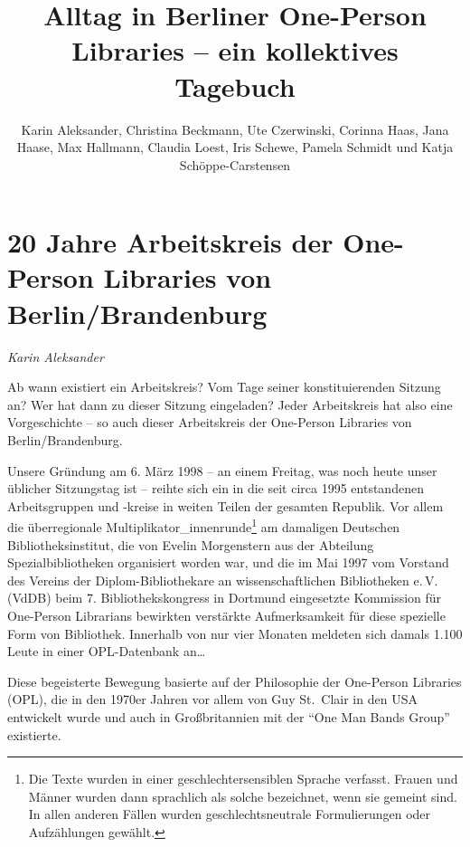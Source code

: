 \documentclass[a4paper,
fontsize=11pt,
oneside,
numbers=noperiodatend,
parskip=half-,
bibliography=totoc,
final
]{scrartcl}
\title{\LARGE{Alltag in Berliner One-Person Libraries -- ein kollektives Tagebuch}} %
\author{\parbox{10cm}{Karin Aleksander, Christina Beckmann, Ute Czerwinski, Corinna Haas, Jana Haase, Max Hallmann, Claudia Loest, Iris Schewe, Pamela Schmidt und Katja Schöppe-Carstensen}} %
\date{}
\begin{document}
\maketitle
\thispagestyle{fancyplain} 


\hypertarget{jahre-arbeitskreis-der-one-person-libraries-von-berlinbrandenburg}{%
\section{20 Jahre Arbeitskreis der One-Person Libraries von
Berlin/Brandenburg}\label{jahre-arbeitskreis-der-one-person-libraries-von-berlinbrandenburg}}

\emph{Karin Aleksander}

Ab wann existiert ein Arbeitskreis? Vom Tage seiner konstituierenden
Sitzung an? Wer hat dann zu dieser Sitzung eingeladen? Jeder
Arbeitskreis hat also eine Vorgeschichte -- so auch dieser Arbeitskreis
der One-Person Libraries von Berlin/Brandenburg.

Unsere Gründung am 6. März 1998 -- an einem Freitag, was noch heute
unser üblicher Sitzungstag ist -- reihte sich ein in die seit circa 1995
entstandenen Arbeitsgruppen und -kreise in weiten Teilen der gesamten
Republik. Vor allem die überregionale
Multiplikator\_innenrunde\footnote{Die Texte wurden in einer
  geschlechtersensiblen Sprache verfasst. Frauen und Männer wurden dann
  sprachlich als solche bezeichnet, wenn sie gemeint sind. In allen
  anderen Fällen wurden geschlechtsneutrale Formulierungen oder
  Aufzählungen gewählt.} am damaligen Deutschen Bibliotheksinstitut, die
von Evelin Morgenstern aus der Abteilung Spezialbibliotheken organisiert
worden war, und die im Mai 1997 vom Vorstand des Vereins der
Diplom-Bibliothekare an wissenschaftlichen Bibliotheken e.\,V. (VdDB)
beim 7. Bibliothekskongress in Dortmund eingesetzte Kommission für
One-Person Librarians bewirkten verstärkte Aufmerksamkeit für diese
spezielle Form von Bibliothek. Innerhalb von nur vier Monaten meldeten
sich damals 1.100 Leute in einer OPL-Datenbank an\ldots{}

Diese begeisterte Bewegung basierte auf der Philosophie der One-Person
Libraries (OPL), die in den 1970er Jahren vor allem von Guy St.~Clair in
den USA entwickelt wurde und auch in Großbritannien mit der \enquote{One
Man Bands Group} existierte.
\end{document}
